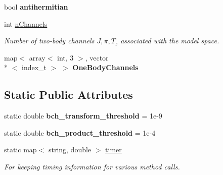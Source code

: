 \begin{DoxyCompactItemize}
\item 
\hypertarget{classOperator_a86dd30fca215948dd9307fa45b7a2e32}{bool {\bfseries antihermitian}}\label{classOperator_a86dd30fca215948dd9307fa45b7a2e32}

\item 
\hypertarget{classOperator_a710cd3c6107a4497e90a04c1f3d2b15f}{int \hyperlink{classOperator_a710cd3c6107a4497e90a04c1f3d2b15f}{n\-Channels}}\label{classOperator_a710cd3c6107a4497e90a04c1f3d2b15f}

\begin{DoxyCompactList}\small\item\em Number of two-\/body channels $ J,\pi,T_z $ associated with the model space. \end{DoxyCompactList}\item 
\hypertarget{classOperator_a380992b76bd3ef1fc2c6dd7e2debf8ff}{map$<$ array$<$ int, 3 $>$, vector\\*
$<$ index\-\_\-t $>$ $>$ {\bfseries One\-Body\-Channels}}\label{classOperator_a380992b76bd3ef1fc2c6dd7e2debf8ff}

\end{DoxyCompactItemize}
\subsection*{Static Public Attributes}
\begin{DoxyCompactItemize}
\item 
\hypertarget{classOperator_af4743d3c6e99ebf1915b348447c8e688}{static double {\bfseries bch\-\_\-transform\-\_\-threshold} = 1e-\/9}\label{classOperator_af4743d3c6e99ebf1915b348447c8e688}

\item 
\hypertarget{classOperator_ad4a2ba438f3286ef22cc06b61f745993}{static double {\bfseries bch\-\_\-product\-\_\-threshold} = 1e-\/4}\label{classOperator_ad4a2ba438f3286ef22cc06b61f745993}

\item 
\hypertarget{classOperator_ae3de2afa3ff3dca088122a79404da831}{static map$<$ string, double $>$ \hyperlink{classOperator_ae3de2afa3ff3dca088122a79404da831}{timer}}\label{classOperator_ae3de2afa3ff3dca088122a79404da831}

\begin{DoxyCompactList}\small\item\em For keeping timing information for various method calls. \end{DoxyCompactList}\end{DoxyCompactItemize}

